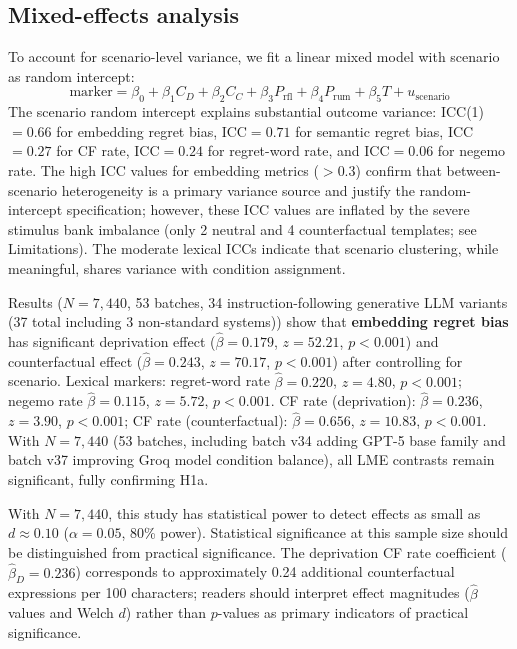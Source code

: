 \documentclass[11pt]{article}
\begin{document}
\subsection{Mixed-effects analysis}\label{sec:lme}

To account for scenario-level variance, we fit a linear mixed model with scenario as random intercept:
\begin{equation}
\text{marker} = \beta_0 + \beta_1 C_D + \beta_2 C_C + \beta_3 P_\text{rfl} + \beta_4 P_\text{rum} + \beta_5 T + u_\text{scenario}
\end{equation}
The scenario random intercept explains substantial outcome variance: ICC(1)$=0.66$ for embedding regret bias, ICC$=0.71$ for semantic regret bias, ICC$=0.27$ for CF rate, ICC$=0.24$ for regret-word rate, and ICC$=0.06$ for negemo rate. The high ICC values for embedding metrics ($>0.3$) confirm that between-scenario heterogeneity is a primary variance source and justify the random-intercept specification; however, these ICC values are inflated by the severe stimulus bank imbalance (only 2 neutral and 4 counterfactual templates; see Limitations). The moderate lexical ICCs indicate that scenario clustering, while meaningful, shares variance with condition assignment.

Results ($N=7{,}440$, 53 batches, 34 instruction-following generative LLM variants (37 total including 3 non-standard systems)) show that \textbf{embedding regret bias} has significant deprivation effect ($\hat{\beta}=0.179$, $z=52.21$, $p<0.001$) and counterfactual effect ($\hat{\beta}=0.243$, $z=70.17$, $p<0.001$) after controlling for scenario. Lexical markers: regret-word rate $\hat{\beta}=0.220$, $z=4.80$, $p<0.001$; negemo rate $\hat{\beta}=0.115$, $z=5.72$, $p<0.001$. CF rate (deprivation): $\hat{\beta}=0.236$, $z=3.90$, $p<0.001$; CF rate (counterfactual): $\hat{\beta}=0.656$, $z=10.83$, $p<0.001$. With $N=7{,}440$ (53 batches, including batch v34 adding GPT-5 base family and batch v37 improving Groq model condition balance), all LME contrasts remain significant, fully confirming H1a.

With $N=7{,}440$, this study has statistical power to detect effects as small as $d\approx0.10$ ($\alpha=0.05$, 80\% power). Statistical significance at this sample size should be distinguished from practical significance. The deprivation CF rate coefficient ($\hat{\beta}_D=0.236$) corresponds to approximately 0.24 additional counterfactual expressions per 100 characters; readers should interpret effect magnitudes ($\hat{\beta}$ values and Welch $d$) rather than $p$-values as primary indicators of practical significance.
\end{document}
